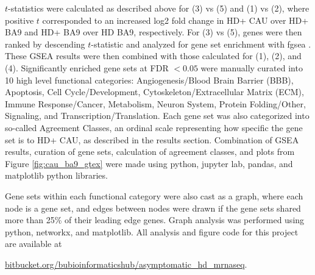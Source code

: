 \documentclass[fleqn,10pt,table]{wlscirep}
\begin{document}
$t$-statistics were calculated as described above for (3) vs (5) and (1) vs (2), where positive $t$ corresponded to an increased log2 fold change in HD+ CAU over HD+ BA9 and HD+ BA9 over HD BA9, respectively.
For (3) vs (5), genes were then ranked by descending $t$-statistic and analyzed for gene set enrichment with fgsea \cite{Sergushichev2016-hz}.
These GSEA results were then combined with those calculated for (1), (2), and (4).
Significantly enriched gene sets at FDR $<0.05$ were manually curated into 10 high level functional categories: Angiogenesis/Blood Brain Barrier (BBB), Apoptosis, Cell Cycle/Development, Cytoskeleton/Extracellular Matrix (ECM), Immune Response/Cancer, Metabolism, Neuron System, Protein Folding/Other, Signaling, and Transcription/Translation.
Each gene set was also categorized into so-called Agreement Classes, an ordinal scale representing how specific the gene set is to HD+ CAU, as described in the results section.
Combination of GSEA results, curation of gene sets, calculation of agreement classes, and plots from Figure \ref{fig:cau_ba9_gtex} were made using python, jupyter lab, pandas, and matplotlib python libraries.

Gene sets within each functional category were also cast as a graph, where each node is a gene set, and edges between nodes were drawn if the gene sets shared more than 25\% of their leading edge genes.
Graph analysis was performed using python, networkx, and matplotlib.
All analysis and figure code for this project are available at

\href{https://bitbucket.org/bubioinformaticshub/asymptomatic_hd_mrnaseq}{bitbucket.org/bubioinformaticshub/asymptomatic\_hd\_mrnaseq}.



\end{document}
